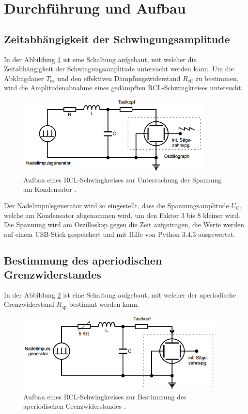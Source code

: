 \section{Durchführung und Aufbau}
\label{sec:Durchführung}

\subsection{Zeitabhängigkeit der Schwingungsamplitude}
In der Abbildung \ref{fig:Durch1} ist eine Schaltung aufgebaut, mit welcher die Zeitabhängigkeit der Schwingungsamplitude untersucht werden kann. Um die Abklingdauer $T_\text{ex}$ und den effektiven Dämpfungswiderstand $R_\text{eff}$ zu bestimmen, wird die Amplitudenabnahme eines gedämpften RCL-Schwingkreises untersucht.

\begin{figure}
  \centering
  \includegraphics[height=4cm]{picture/Durch1.PNG}
  \caption{Aufbau eines RCL-Schwingkreises zur Untersuchung der Spannung am Kondensator \cite[294]{sample}.}
  \label{fig:Durch1}
\end{figure}

Der Nadelimpulsgenerator wird so eingestellt, dass die Spannungsamplitude $U_\text{C}$, welche am Kondensator abgenommen wird, um den Faktor 3 bis 8 kleiner wird. Die Spannung wird am Oszilloskop gegen die Zeit aufgetragen, die Werte werden auf einem USB-Stick gespeichert und mit Hilfe von Python 3.4.3 ausgewertet.

\subsection{Bestimmung des aperiodischen Grenzwiderstandes}
In der Abbildung \ref{fig:Durch2} ist eine Schaltung aufgebaut, mit welcher der aperiodische Grenzwiderstand $R_\text{ap}$ bestimmt werden kann.

\begin{figure}
  \centering
  \includegraphics[height=4cm]{picture/Durch2.PNG}
  \caption{Aufbau eines RCL-Schwingkreises zur Bestimmung des aperiodischen Grenzwiderstandes \cite[295]{sample}.}
  \label{fig:Durch2}
\end{figure}

